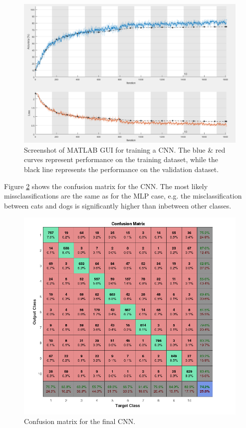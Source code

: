 \begin{figure}[h!]
	\centering
	\includegraphics[width=\textwidth]{images/CNNTrain}
	\caption{Screenshot of MATLAB GUI for training a CNN. The blue \& red curves represent performance on the training dataset, while the black line represents the performance on the validation dataset.}
	\label{fig:CNNTrain}
\end{figure}

Figure \ref{fig:CNNConfusion} shows the confusion matrix for the CNN. The most likely missclassifications are the same as for the MLP case, e.g. the misclassification between cats and dogs is significantly higher than inbetween other classes.

\begin{figure}[h!]
	\centering
	\includegraphics[width=\textwidth]{images/Confusion_MatrixCNN.png}
	\caption{Confusion matrix for the final CNN.}
	\label{fig:CNNConfusion}
\end{figure}
\FloatBarrier